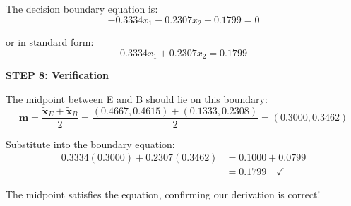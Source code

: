 \documentclass[12pt]{article}
\begin{document}
\begin{solution}
The decision boundary equation is:
\[
\boxed{-0.3334 x_1 - 0.2307 x_2 + 0.1799 = 0}
\]

or in standard form:
\[
\boxed{0.3334 x_1 + 0.2307 x_2 = 0.1799}
\]

\textbf{STEP 8: Verification}

The midpoint between E and B should lie on this boundary:
\[
\mathbf{m} = \frac{\tilde{\mathbf{x}}_E + \tilde{\mathbf{x}}_B}{2} = \frac{(0.4667, 0.4615) + (0.1333, 0.2308)}{2} = (0.3000, 0.3462)
\]

Substitute into the boundary equation:
\begin{align*}
0.3334(0.3000) + 0.2307(0.3462) &= 0.1000 + 0.0799 \\
&= 0.1799 \quad \checkmark
\end{align*}

The midpoint satisfies the equation, confirming our derivation is correct!
\end{solution}
\end{document}
